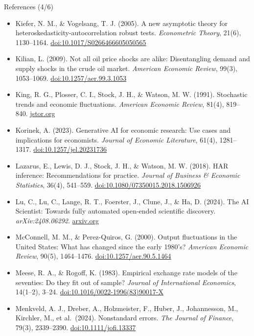 \begin{frame}{References (4/6)}
\itemsize{\tiny}
\begin{itemize}
    \item Kiefer, N. M., \& Vogelsang, T. J. (2005). A new asymptotic theory for heteroskedasticity-autocorrelation robust tests. \textit{Econometric Theory}, 21(6), 1130--1164. \href{https://doi.org/10.1017/S0266466605050565}{doi:10.1017/S0266466605050565}
    \item Kilian, L. (2009). Not all oil price shocks are alike: Disentangling demand and supply shocks in the crude oil market. \textit{American Economic Review}, 99(3), 1053--1069. \href{https://doi.org/10.1257/aer.99.3.1053}{doi:10.1257/aer.99.3.1053}
    \item King, R. G., Plosser, C. I., Stock, J. H., \& Watson, M. W. (1991). Stochastic trends and economic fluctuations. \textit{American Economic Review}, 81(4), 819--840. \href{https://www.jstor.org/stable/2006644}{jstor.org}
    \item Korinek, A. (2023). Generative AI for economic research: Use cases and implications for economists. \textit{Journal of Economic Literature}, 61(4), 1281--1317. \href{https://doi.org/10.1257/jel.20231736}{doi:10.1257/jel.20231736}
    \item Lazarus, E., Lewis, D. J., Stock, J. H., \& Watson, M. W. (2018). HAR inference: Recommendations for practice. \textit{Journal of Business \& Economic Statistics}, 36(4), 541--559. \href{https://doi.org/10.1080/07350015.2018.1506926}{doi:10.1080/07350015.2018.1506926}
    \item Lu, C., Lu, C., Lange, R. T., Foerster, J., Clune, J., \& Ha, D. (2024). The AI Scientist: Towards fully automated open-ended scientific discovery. \textit{arXiv:2408.06292}. \href{https://arxiv.org/abs/2408.06292}{arxiv.org}
    \item McConnell, M. M., \& Perez-Quiros, G. (2000). Output fluctuations in the United States: What has changed since the early 1980's? \textit{American Economic Review}, 90(5), 1464--1476. \href{https://doi.org/10.1257/aer.90.5.1464}{doi:10.1257/aer.90.5.1464}
    \item Meese, R. A., \& Rogoff, K. (1983). Empirical exchange rate models of the seventies: Do they fit out of sample? \textit{Journal of International Economics}, 14(1--2), 3--24. \href{https://doi.org/10.1016/0022-1996(83)90017-X}{doi:10.1016/0022-1996(83)90017-X}
    \item Menkveld, A. J., Dreber, A., Holzmeister, F., Huber, J., Johannesson, M., Kirchler, M., et al.\ (2024). Nonstandard errors. \textit{The Journal of Finance}, 79(3), 2339--2390. \href{https://doi.org/10.1111/jofi.13337}{doi:10.1111/jofi.13337}

\end{itemize}
\end{frame}
